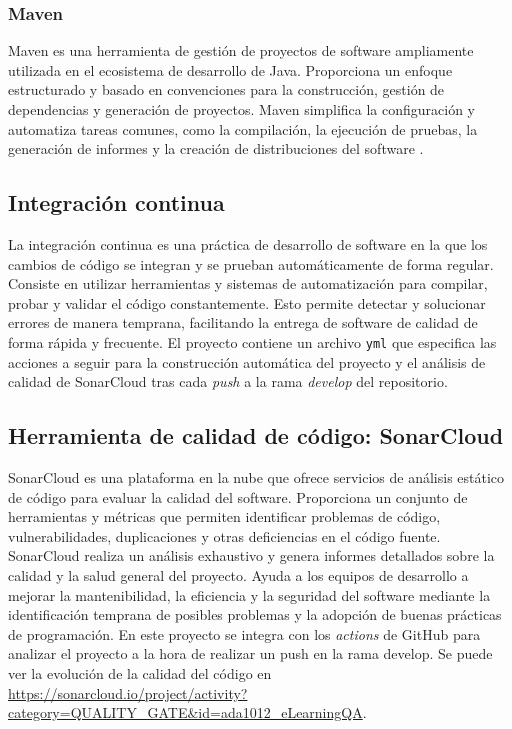 \subsubsection{Maven}
Maven es una herramienta de gestión de proyectos de software ampliamente utilizada en el ecosistema de desarrollo de Java. Proporciona un enfoque estructurado y basado en convenciones para la construcción, gestión de dependencias y generación de proyectos. Maven simplifica la configuración y automatiza tareas comunes, como la compilación, la ejecución de pruebas, la generación de informes y la creación de distribuciones del software \cite{packt2014}.
\subsection{Integración continua}
La integración continua es una práctica de desarrollo de software en la que los cambios de código se integran y se prueban automáticamente de forma regular. Consiste en utilizar herramientas y sistemas de automatización para compilar, probar y validar el código constantemente. Esto permite detectar y solucionar errores de manera temprana, facilitando la entrega de software de calidad de forma rápida y frecuente. 
El proyecto contiene un archivo \texttt{yml} que especifica las acciones a seguir para la construcción automática del proyecto y el análisis de calidad de SonarCloud tras cada \textit{push} a la rama \textit{develop} del repositorio.
\subsection{Herramienta de calidad de código: SonarCloud}
SonarCloud es una plataforma en la nube que ofrece servicios de análisis estático de código para evaluar la calidad del software. Proporciona un conjunto de herramientas y métricas que permiten identificar problemas de código, vulnerabilidades, duplicaciones y otras deficiencias en el código fuente. SonarCloud realiza un análisis exhaustivo y genera informes detallados sobre la calidad y la salud general del proyecto. Ayuda a los equipos de desarrollo a mejorar la mantenibilidad, la eficiencia y la seguridad del software mediante la identificación temprana de posibles problemas y la adopción de buenas prácticas de programación.
En este proyecto se integra con los \textit{actions} de GitHub para analizar el proyecto a la hora de realizar un push en la rama develop.
Se puede ver la evolución de la calidad del código en \url{https://sonarcloud.io/project/activity?category=QUALITY_GATE&id=ada1012_eLearningQA}.

